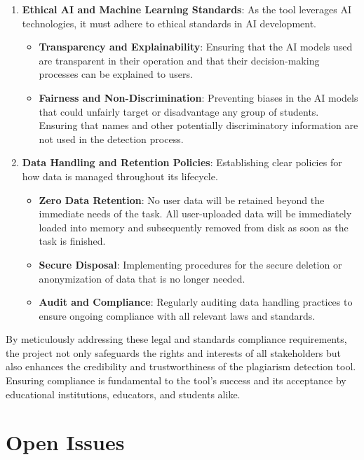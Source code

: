 \documentclass[12pt]{article}
\begin{document}
\begin{enumerate}
    \item \textbf{Ethical AI and Machine Learning Standards}: As the tool leverages AI
    technologies, it must adhere to ethical standards in AI development.
    \begin{itemize}
        \item \textbf{Transparency and Explainability}: Ensuring that the AI models used
        are transparent in their operation and that their decision-making processes can be
        explained to users.
        \item \textbf{Fairness and Non-Discrimination}: Preventing biases in the AI models
        that could unfairly target or disadvantage any group of students. Ensuring that names
        and other potentially discriminatory information are not used in the detection process.
    \end{itemize}

    \item \textbf{Data Handling and Retention Policies}: Establishing clear policies for
    how data is managed throughout its lifecycle.
    \begin{itemize}
        \item \textbf{Zero Data Retention}: No user data will be retained beyond the immediate needs of the task.
        All user-uploaded data will be immediately loaded into memory and subsequently removed from disk as soon
        as the task is finished.
        \item \textbf{Secure Disposal}: Implementing procedures for the secure deletion or
        anonymization of data that is no longer needed.
        \item \textbf{Audit and Compliance}: Regularly auditing data handling practices to
        ensure ongoing compliance with all relevant laws and standards.
    \end{itemize}
\end{enumerate}

By meticulously addressing these legal and standards compliance requirements, the
project not only safeguards the rights and interests of all stakeholders but also
enhances the credibility and trustworthiness of the plagiarism detection tool. Ensuring
compliance is fundamental to the tool's success and its acceptance by educational
institutions, educators, and students alike.


\section{Open Issues}
\end{document}
